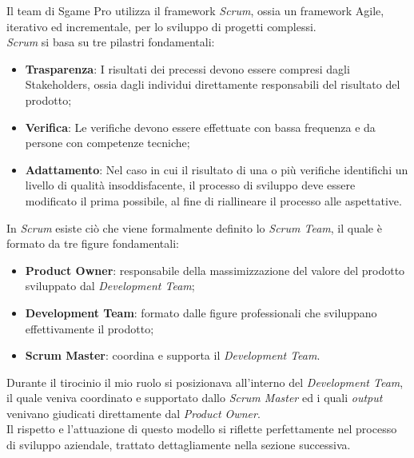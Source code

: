 \documentclass[11pt]{thesistemp}
\begin{document}
Il team di Sgame Pro utilizza il framework \textit{Scrum}, ossia un framework Agile, iterativo ed incrementale, per lo sviluppo di progetti complessi.\\
\textit{Scrum} si basa su tre pilastri fondamentali:
\begin{itemize}
	\item \textbf{Trasparenza}: I risultati dei precessi devono essere compresi dagli Stakeholders, ossia dagli individui direttamente responsabili del risultato del prodotto;
	\item \textbf{Verifica}: Le verifiche devono essere effettuate con bassa frequenza e da persone con competenze tecniche;
	\item \textbf{Adattamento}: Nel caso in cui il risultato di una o più verifiche identifichi un livello di qualità insoddisfacente, il processo di sviluppo deve essere modificato il prima possibile, al fine di riallineare il processo alle aspettative.
\end{itemize}
In \textit{Scrum} esiste ciò che viene formalmente definito lo \textit{Scrum Team}, il quale è formato da tre figure fondamentali:
\begin{itemize}
	\item \textbf{Product Owner}: responsabile della massimizzazione del valore del prodotto sviluppato dal \textit{Development Team};
	\item \textbf{Development Team}: formato dalle figure professionali che sviluppano effettivamente il prodotto;
	\item \textbf{Scrum Master}: coordina e supporta il \textit{Development Team}.
\end{itemize}
Durante il tirocinio il mio ruolo si posizionava all'interno del \textit{Development Team}, il quale veniva coordinato e supportato dallo \textit{Scrum Master} ed i quali \textit{output} venivano giudicati direttamente dal \textit{Product Owner}.\\
Il rispetto e l'attuazione di questo modello si riflette perfettamente nel processo di sviluppo aziendale, trattato dettagliamente nella sezione successiva.
\end{document}
